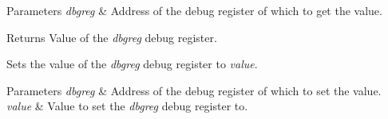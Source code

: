 \begin{DoxyParams}{Parameters}
{\em dbgreg} & Address of the debug register of which to get the value.\\
\hline
\end{DoxyParams}
\begin{DoxyReturn}{Returns}
Value of the {\itshape dbgreg} debug register.
\end{DoxyReturn}
Sets the value of the {\itshape dbgreg} debug register to {\itshape value}.


\begin{DoxyParams}{Parameters}
{\em dbgreg} & Address of the debug register of which to set the value. \\
\hline
{\em value} & Value to set the {\itshape dbgreg} debug register to.\\
\hline
\end{DoxyParams}
